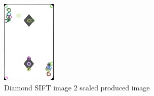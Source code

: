 \documentclass[conference]{IEEEtran}
\begin{document}
\begin{figure}[!htb]
\begin{minipage}[b]{0.2\textwidth}
    \includegraphics[width=\textwidth]{../programme/results/Task_1/scaled_experiements/SIFT/diamond/image_2.jpg}
    \caption{Diamond SIFT image 2 scaled produced image}
    \label{Diamond SIFT image 2 scaled produced image}
  \end{minipage}
  \hfill
    \begin{minipage}[b]{0.2\textwidth}

\end{minipage}
\end{figure}
\end{document}
